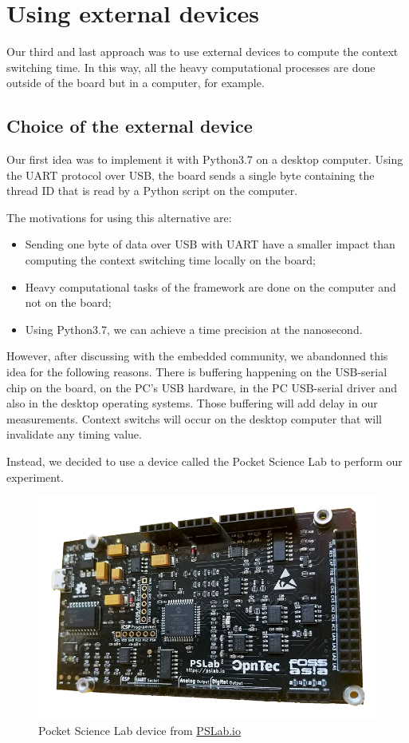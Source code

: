 \section{Using external devices \label{sec:external}}

Our third and last approach was to use external devices to compute the context switching time.
In this way, all the heavy computational processes are done outside of the board but in a computer, for example.

\subsection{Choice of the external device}

Our first idea was to implement it with Python3.7 on a desktop computer.
Using the UART protocol over USB, the board sends a single byte containing the thread ID that is read by a Python script on the computer.

The motivations for using this alternative are:
\begin{itemize}
  \item Sending one byte of data over USB with UART have a smaller impact than computing the context switching time locally on the board;
  \item Heavy computational tasks of the framework are done on the computer and not on the board;
  \item Using Python3.7, we can achieve a time precision at the nanosecond.
\end{itemize}

However, after discussing with the embedded community, we abandonned this idea for the following reasons.
There is buffering happening on the USB-serial chip on the board, on the PC's USB hardware, in the PC USB-serial driver and also in the desktop operating systems.
Those buffering will add delay in our measurements.
Context switchs will occur on the desktop computer that will invalidate any timing value.

Instead, we decided to use a device called the Pocket Science Lab to perform our experiment.

\begin{figure}[!ht]
  \centering
  \includegraphics[scale=0.25]{assets/pslab.png}
  \caption{\label{fig:pslab}Pocket Science Lab device from \href{https://pslab.io}{PSLab.io}}
\end{figure}


